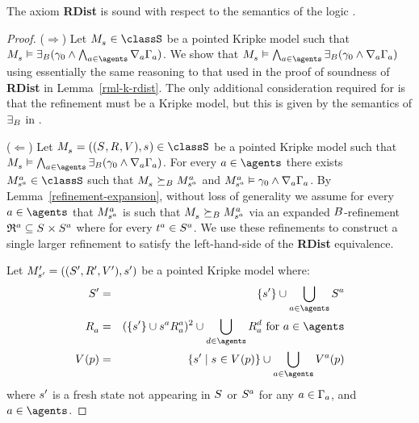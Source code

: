 \begin{lemma}\label{rml-s5-rdist}
The axiom {\bf RDist} is sound with respect to the semantics of the logic \logicRmlS{}.
\end{lemma}

\begin{proof}
($\Rightarrow$)
Let $\kPModel{\kStateS} \in \classS$ be a pointed Kripke model such that $\kPModel{\kStateS} \entails \somerefsBs (\gamma_0 \land \bigwedge_{\agentA \in \agents} \coversA \Gamma_\agentA)$.
We show that $\kPModel{\kStateS} \entails \bigwedge_{\agentA \in \agents} \somerefsBs (\gamma_0 \land \coversA \Gamma_\agentA)$ using essentially the same reasoning to that used in the proof of soundness of {\bf RDist} in Lemma~\ref{rml-k-rdist}.
The only additional consideration required for \logicRmlS{} is that the refinement must be a \classS{} Kripke model, but this is given by the semantics of $\somerefsBs$ in \logicRmlS{}.

($\Leftarrow$)
Let $\kPModelAndTuple{\kStateS} \in \classS$ be a pointed Kripke model such that $\kPModel{\kStateS} \entails \bigwedge_{\agentA \in \agents} \somerefsBs (\gamma_0 \land \coversA \Gamma_\agentA)$.
For every $\agentA \in \agents$ there exists $\kPModel[\agentA]{\kStateS[\agentA]} \in \classS$ such that $\kPModel{\kStateS} \simulatesBs \kPModel[\agentA]{\kStateS[\agentA]}$ and $\kPModel[\agentA]{\kStateS[\agentA]} \entails \gamma_0 \land \coversA \Gamma_\agentA$.
By Lemma~\ref{refinement-expansion}, without loss of generality we assume for every $\agentA \in \agents$ that $\kPModel[\agentA]{\kStateS[\agentA]}$ is such that $\kPModel{\kStateS} \simulatesBs \kPModel[\agentA]{\kStateS[\agentA]}$ via an expanded $\agentsB$-refinement $\refinement^{\agentA} \subseteq \kStates \times \kStates[\agentA]$ where for every $\kStateT[\agentA] \in \kStates[\agentA]$.
We use these refinements to construct a single larger refinement to satisfy the left-hand-side of the {\bf RDist} equivalence.

Let $\kPModelAndTupleP{\kStateSP}$ be a pointed Kripke model where:
\begin{eqnarray*}
    \kStatesP &=& \{\kStateSP\} \cup \bigcup_{\agentA \in \agents} \kStates[\agentA]\\
    \kAccessibilityA &=& (\{\kStateSP\} \cup \kSuccessorsA[\agentA]{\kStateS[\agentA]})^2 \cup \bigcup_{\agentD \in \agents} \kAccessibilityA[\agentD] \text{ for } \agentA \in \agents\\
    \kValuation(\atomP) &=& \{\kStateSP \mid \kStateS \in \kValuation(\atomP)\} \cup \bigcup_{\agentA \in \agents} \kValuation[\agentA](\atomP)
\end{eqnarray*}
where $\kStateSP$ is a fresh state not appearing in $\kStates$ or $\kStates[\agentA]$ for any $\agentA \in \Gamma_\agentA$, and $\agentA \in \agents$.


\end{proof}
